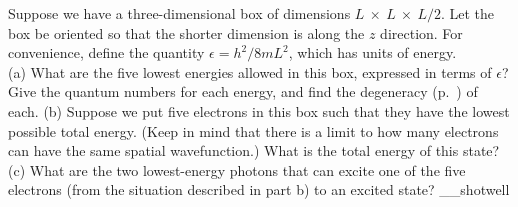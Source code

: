 Suppose we have a three-dimensional box of dimensions $L\ \times\ L\ \times\ L/2$.
Let the box be oriented so that the shorter dimension is along the $z$ direction.
For convenience, define the quantity $\epsilon=h^2/8mL^2$, which has units of energy.\\
(a) What are the five lowest energies allowed in this box, expressed in terms of
$\epsilon$? Give the quantum numbers for each energy,
and find the degeneracy (p.~\pageref{subsubsec:degeneracy}) of each.\hwendpart
(b) Suppose we put five electrons in this box such that they have the lowest
possible total energy. (Keep in
mind that there is a limit to how many electrons can have the same spatial wavefunction.) What is the
total energy of this state?\answercheck\hwendpart
(c) What are the two lowest-energy photons that can excite one of the five electrons (from the situation
described in part b) to an excited state?\answercheck\hwendpart
__shotwell
